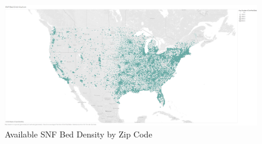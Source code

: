 \documentclass{article}
\theoremstyle{mytheoremstyle}
\theoremstyle{mytheoremstyle}
\theoremstyle{myproblemstyle}
\begin{document}
\begin{figure}[htbp]
\centering
\includegraphics[width=\linewidth]{Images/SNF Bed Distribution.png}
\caption{Available SNF Bed Density by Zip Code}
\label{fig:netincome EDA}
\end{figure}
\end{document}
